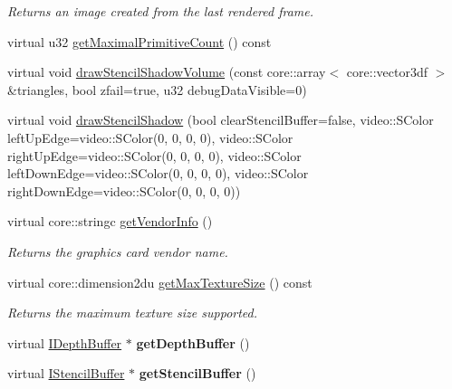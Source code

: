 \begin{DoxyCompactItemize}
\begin{DoxyCompactList}\small\item\em Returns an image created from the last rendered frame. \end{DoxyCompactList}\item 
virtual u32 \hyperlink{classirr_1_1video_1_1_c_burning_video_driver_a084391a2426db72cd4a17b252ac328b2}{get\-Maximal\-Primitive\-Count} () const 
\item 
virtual void \hyperlink{classirr_1_1video_1_1_c_burning_video_driver_ad615c3004453ea4249e5710d5cdea47b}{draw\-Stencil\-Shadow\-Volume} (const core\-::array$<$ core\-::vector3df $>$ \&triangles, bool zfail=true, u32 debug\-Data\-Visible=0)
\item 
virtual void \hyperlink{classirr_1_1video_1_1_c_burning_video_driver_a6f1602034bc3b3f586137acc683a4c4f}{draw\-Stencil\-Shadow} (bool clear\-Stencil\-Buffer=false, video\-::\-S\-Color left\-Up\-Edge=video\-::\-S\-Color(0, 0, 0, 0), video\-::\-S\-Color right\-Up\-Edge=video\-::\-S\-Color(0, 0, 0, 0), video\-::\-S\-Color left\-Down\-Edge=video\-::\-S\-Color(0, 0, 0, 0), video\-::\-S\-Color right\-Down\-Edge=video\-::\-S\-Color(0, 0, 0, 0))
\item 
\hypertarget{classirr_1_1video_1_1_c_burning_video_driver_a8e2620af220dc8126db89d89974adcbb}{virtual core\-::stringc \hyperlink{classirr_1_1video_1_1_c_burning_video_driver_a8e2620af220dc8126db89d89974adcbb}{get\-Vendor\-Info} ()}\label{classirr_1_1video_1_1_c_burning_video_driver_a8e2620af220dc8126db89d89974adcbb}

\begin{DoxyCompactList}\small\item\em Returns the graphics card vendor name. \end{DoxyCompactList}\item 
\hypertarget{classirr_1_1video_1_1_c_burning_video_driver_a366ec7976e3d03452de960d120050989}{virtual core\-::dimension2du \hyperlink{classirr_1_1video_1_1_c_burning_video_driver_a366ec7976e3d03452de960d120050989}{get\-Max\-Texture\-Size} () const }\label{classirr_1_1video_1_1_c_burning_video_driver_a366ec7976e3d03452de960d120050989}

\begin{DoxyCompactList}\small\item\em Returns the maximum texture size supported. \end{DoxyCompactList}\item 
\hypertarget{classirr_1_1video_1_1_c_burning_video_driver_a0650fd8659994f77e60f2ecdbc4dbac8}{virtual \hyperlink{classirr_1_1video_1_1_i_depth_buffer}{I\-Depth\-Buffer} $\ast$ {\bfseries get\-Depth\-Buffer} ()}\label{classirr_1_1video_1_1_c_burning_video_driver_a0650fd8659994f77e60f2ecdbc4dbac8}

\item 
\hypertarget{classirr_1_1video_1_1_c_burning_video_driver_a554ecaed564b5293bcc57d92f1b527d3}{virtual \hyperlink{classirr_1_1video_1_1_i_stencil_buffer}{I\-Stencil\-Buffer} $\ast$ {\bfseries get\-Stencil\-Buffer} ()}\label{classirr_1_1video_1_1_c_burning_video_driver_a554ecaed564b5293bcc57d92f1b527d3}

\end{DoxyCompactItemize}
